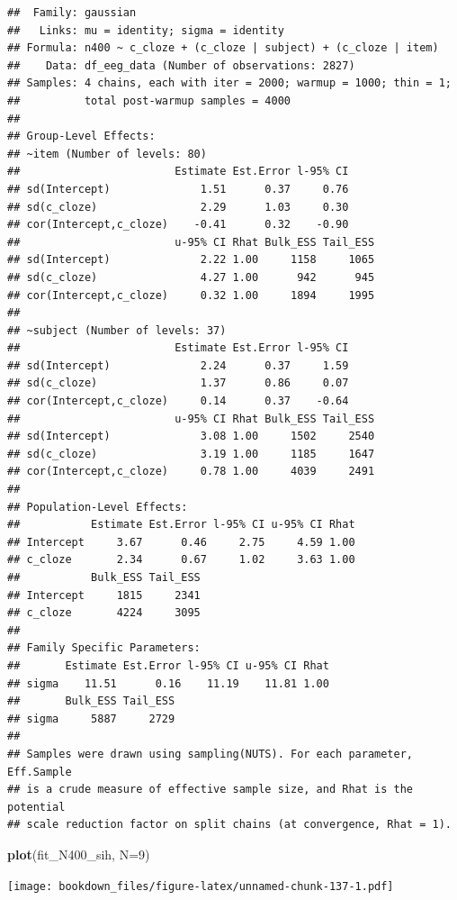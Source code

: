 \documentclass[12pt,]{krantz}
\newenvironment{Shaded}{\begin{snugshade}}{\end{snugshade}}
\newcommand{\DataTypeTok}[1]{\textcolor[rgb]{0.13,0.29,0.53}{#1}}
\newcommand{\DecValTok}[1]{\textcolor[rgb]{0.00,0.00,0.81}{#1}}
\newcommand{\KeywordTok}[1]{\textcolor[rgb]{0.13,0.29,0.53}{\textbf{#1}}}
\newcommand{\NormalTok}[1]{#1}
\theoremstyle{definition}
\theoremstyle{definition}
\theoremstyle{definition}
\theoremstyle{remark}
\begin{document}
\begin{verbatim}
##  Family: gaussian 
##   Links: mu = identity; sigma = identity 
## Formula: n400 ~ c_cloze + (c_cloze | subject) + (c_cloze | item) 
##    Data: df_eeg_data (Number of observations: 2827) 
## Samples: 4 chains, each with iter = 2000; warmup = 1000; thin = 1;
##          total post-warmup samples = 4000
## 
## Group-Level Effects: 
## ~item (Number of levels: 80) 
##                        Estimate Est.Error l-95% CI
## sd(Intercept)              1.51      0.37     0.76
## sd(c_cloze)                2.29      1.03     0.30
## cor(Intercept,c_cloze)    -0.41      0.32    -0.90
##                        u-95% CI Rhat Bulk_ESS Tail_ESS
## sd(Intercept)              2.22 1.00     1158     1065
## sd(c_cloze)                4.27 1.00      942      945
## cor(Intercept,c_cloze)     0.32 1.00     1894     1995
## 
## ~subject (Number of levels: 37) 
##                        Estimate Est.Error l-95% CI
## sd(Intercept)              2.24      0.37     1.59
## sd(c_cloze)                1.37      0.86     0.07
## cor(Intercept,c_cloze)     0.14      0.37    -0.64
##                        u-95% CI Rhat Bulk_ESS Tail_ESS
## sd(Intercept)              3.08 1.00     1502     2540
## sd(c_cloze)                3.19 1.00     1185     1647
## cor(Intercept,c_cloze)     0.78 1.00     4039     2491
## 
## Population-Level Effects: 
##           Estimate Est.Error l-95% CI u-95% CI Rhat
## Intercept     3.67      0.46     2.75     4.59 1.00
## c_cloze       2.34      0.67     1.02     3.63 1.00
##           Bulk_ESS Tail_ESS
## Intercept     1815     2341
## c_cloze       4224     3095
## 
## Family Specific Parameters: 
##       Estimate Est.Error l-95% CI u-95% CI Rhat
## sigma    11.51      0.16    11.19    11.81 1.00
##       Bulk_ESS Tail_ESS
## sigma     5887     2729
## 
## Samples were drawn using sampling(NUTS). For each parameter, Eff.Sample 
## is a crude measure of effective sample size, and Rhat is the potential 
## scale reduction factor on split chains (at convergence, Rhat = 1).
\end{verbatim}

\begin{Shaded}
\begin{Highlighting}[]
\KeywordTok{plot}\NormalTok{(fit_N400_sih, }\DataTypeTok{N=}\DecValTok{9}\NormalTok{)}
\end{Highlighting}
\end{Shaded}

\texttt{[image: bookdown\_files/figure-latex/unnamed-chunk-137-1.pdf]}
\end{document}
